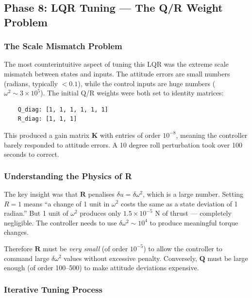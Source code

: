 \documentclass[12pt, a4paper]{article}
\newcommand{\bK}{\bm{K}}
\newcommand{\bQ}{\bm{Q}}
\newcommand{\bR}{\bm{R}}
\begin{document}
\subsection{Phase 8: LQR Tuning --- The Q/R Weight Problem}

\subsubsection{The Scale Mismatch Problem}

The most counterintuitive aspect of tuning this LQR was the extreme scale mismatch between states and inputs.  The attitude errors are small numbers (radians, typically $< 0.1$), while the control inputs are huge numbers ($\omega^2 \sim 3 \times 10^5$).  The initial Q/R weights were both set to identity matrices:
\begin{verbatim}
    Q_diag: [1, 1, 1, 1, 1, 1]
    R_diag: [1, 1, 1]
\end{verbatim}
This produced a gain matrix $\bK$ with entries of order $10^{-8}$, meaning the controller barely responded to attitude errors.  A 10 degree roll perturbation took over 100 seconds to correct.

\subsubsection{Understanding the Physics of R}

The key insight was that $\bR$ penalises $\delta u = \delta\omega^2$, which is a large number.  Setting $R = 1$ means ``a change of 1 unit in $\omega^2$ costs the same as a state deviation of 1 radian.''  But 1 unit of $\omega^2$ produces only $1.5 \times 10^{-5}$ N of thrust --- completely negligible.  The controller needs to use $\delta\omega^2 \sim 10^4$ to produce meaningful torque changes.

Therefore $\bR$ must be \emph{very small} (of order $10^{-5}$) to allow the controller to command large $\delta\omega^2$ values without excessive penalty.  Conversely, $\bQ$ must be large enough (of order 100--500) to make attitude deviations expensive.

\subsubsection{Iterative Tuning Process}
\end{document}
